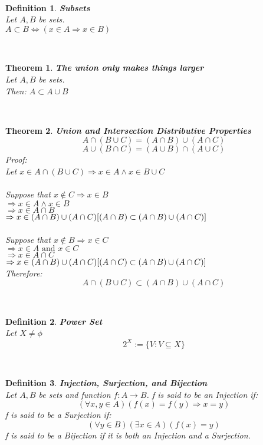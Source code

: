 \documentclass[12pt]{extarticle}
\theoremstyle{plain}
\newtheorem{thm}{Theorem}[section]
\theoremstyle{plain}
\theoremstyle{plain}
\theoremstyle{Definition}
\newtheorem{def.}{Definition}[section]
\theoremstyle{Definition}
\theoremstyle{plain}
\newcommand{\cut}[0]{\noindent\framebox[\linewidth]{\rule{\linewidth}{2pt}}\\}
\begin{document}
\cut
\begin{def.} \textbf{Subsets} \\ 
	Let $A,B$ be sets. \\ 
	$A \subset B \Leftrightarrow (x \in A \Rightarrow x \in B)$
\end{def.}
\cut
\begin{thm} \textbf{The union only makes things larger} \\
	Let $A,B$ be sets. \\ 
	Then: $A \subset A \cup B$ \\ 
\end{thm}
\cut
\begin{thm} \textbf{Union and Intersection Distributive Properties} \\ 
	$$A \cap (B \cup C) = (A \cap B) \cup (A \cap C)$$ 	
	$$A \cup (B \cap C) = (A \cup B) \cap (A \cup C)$$
	Proof: \\
	Let $x \in A \cap (B \cup C) \Rightarrow x \in A \land x \in B \cup C$ \\ \\
	Suppose that $x \not \in C \Rightarrow x \in B$ \\ 
	$\Rightarrow x \in A \land x \in B$ \\ 
	$\Rightarrow x \in A \cap B$ \\ 
	$\Rightarrow x \in (A \cap B) \cup (A \cap C) \hfill [(A \cap B) \subset (A \cap B) \cup (A \cap C)]$ \\ \\
	Suppose that $x \not \in B \Rightarrow x \in C$ \\ 
	$\Rightarrow x \in A \text{ and } x \in C$ \\ 
	$\Rightarrow x \in A \cap C$ \\ 
	$\Rightarrow x \in (A \cap B) \cup (A \cap C) \hfill [(A \cap C) \subset (A \cap B) \cup (A \cap C)]$ \\
	Therefore: \\ 
	$$A \cap (B \cup C) \subset (A \cap B) \cup (A \cap C)$$ 	
\end{thm}
\cut
\begin{def.} \textbf{Power Set} \\ 
	Let $X \not = \phi$ \\ 
	$$2^X := \{V : V \subseteq X\}$$
\end{def.}
\cut
\begin{def.} \textbf{Injection, Surjection, and Bijection} \\
	Let $A,B$ be sets and  function $f : A \to B$.
	f is said to be an Injection if: \\ 
	$$(\forall x,y \in A)(f(x) = f(y) \Rightarrow x = y)$$
	f is said to be a Surjection if: \\ 
	$$(\forall y \in B)(\exists x \in A)(f(x) = y)$$
	f is said to be a Bijection if it is both an Injection and a Surjection.  
\end{def.}
\end{document}
